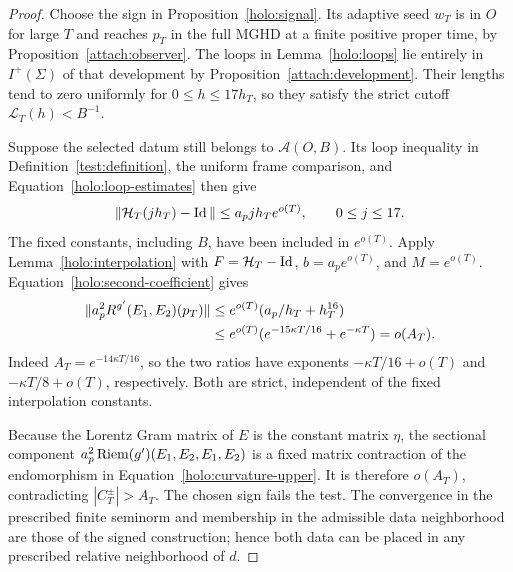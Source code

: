 \begin{proof}
Choose the sign in Proposition~\ref{holo:signal}.  Its adaptive
seed $w_T$ is in $O$ for large $T$ and reaches $p_T$ in the full
MGHD at a finite positive proper time, by
Proposition~\ref{attach:observer}.  The loops in
Lemma~\ref{holo:loops} lie entirely in $I^+(\Sigma)$ of that
development by Proposition~\ref{attach:development}.
Their lengths tend to zero uniformly for $0\leq h\leq17h_T$,
so they satisfy the strict cutoff $\mathcal L_T(h)<B^{-1}$.

Suppose the selected datum still belongs to $\mathcal A(O,B)$.
Its loop inequality in Definition~\ref{test:definition}, the
uniform frame comparison, and Equation~\eqref{holo:loop-estimates}
then give
\[
 \|\mathcal H_T(jh_T)-\operatorname{Id}\|
          \leq a_p jh_T e^{o(T)},\qquad 0\leq j\leq17.
\]
The fixed constants, including $B$, have been included in
$e^{o(T)}$.  Apply Lemma~\ref{holo:interpolation} with
$F=\mathcal H_T-\operatorname{Id}$, $b=a_pe^{o(T)}$, and $M=e^{o(T)}$.
Equation~\eqref{holo:second-coefficient} gives
\begin{align}
 \|a_p^2R^{g'}(E_1,E_2)(p_T)\|
 &\leq e^{o(T)}(a_p/h_T+h_T^{16})                         \label{holo:curvature-upper}\\
 &\leq e^{o(T)}
        (e^{-15\kappa T/16}+e^{-\kappa T})=o(A_T).\notag
\end{align}
Indeed $A_T=e^{-14\kappa T/16}$, so the two ratios have exponents
$-\kappa T/16+o(T)$ and $-\kappa T/8+o(T)$, respectively.
Both are strict, independent of the fixed interpolation constants.

Because the Lorentz Gram matrix of $E$ is the constant matrix
$\eta$, the sectional component
$a_p^2\operatorname{Riem}(g')(E_1,E_2,E_1,E_2)$ is a fixed matrix contraction
of the endomorphism in Equation~\eqref{holo:curvature-upper}.
It is therefore $o(A_T)$, contradicting $|C_T^\pm|>A_T$.
The chosen sign fails the test.  The convergence in the prescribed
finite seminorm and membership in the admissible data neighborhood
are those of the signed construction; hence both data can be
placed in any prescribed relative neighborhood of $d$.
\end{proof}
